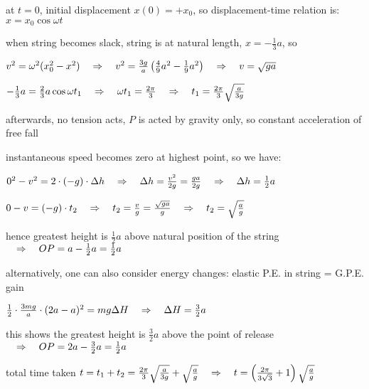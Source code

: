 at $t=0$, initial displacement $x(0)=+x_0$, so displacement-time relation is: $x=x_0\cos\omega t$

when string becomes slack, string is at natural length, $x=-\frac{1}{3}a$, so

{

\centering

$v^2 = \omega^2 (x_0^2 - x^2) \quad \Rightarrow \quad v^2 = \frac{3g}{a} \left( \frac{4}{9}a^2 - \frac{1}{9}a^2 \right) \quad \Rightarrow \quad v=\sqrt{ga}$

$-\frac{1}{3}a = \frac{2}{3}a\cos\omega t_1 \quad \Rightarrow \quad \omega t_1 = \frac{2\pi}{3} \quad \Rightarrow \quad t_1 = \frac{2\pi}{3}\sqrt{\frac{a}{3g}}$

}

afterwards, no tension acts, $P$ is acted by gravity only, so constant acceleration of free fall

instantaneous speed becomes zero at highest point, so we have:

{

\centering

$0^2 - v^2 = 2\cdot(-g) \cdot \Delta h \quad \Rightarrow \quad \Delta h = \frac{v^2}{2g} = \frac{ga}{2g} \quad \Rightarrow \quad \Delta h = \frac{1}{2}a$

$0 - v = (-g)\cdot t_2 \quad \Rightarrow \quad t_2 = \frac{v}{g} = \frac{\sqrt{ga}}{g} \quad \Rightarrow \quad t_2 = \sqrt{\frac{a}{g}}$

}

hence greatest height is $\frac{1}{2}a$ above natural position of the string $\quad \Rightarrow \quad OP=a-\frac{1}{2}a=\frac{1}{2}a$

alternatively, one can also consider energy changes: elastic P.E. in string = G.P.E. gain

{

\centering

$\frac{1}{2}\cdot\frac{3mg}{a}\cdot(2a-a)^2 = mg\Delta H \quad \Rightarrow \quad \Delta H = \frac{3}{2}a$

}

this shows the greatest height is $\frac{3}{2}a$ above the point of release $\quad \Rightarrow \quad OP=2a-\frac{3}{2}a = \frac{1}{2}a$

total time taken $t=t_1+t_2 = \frac{2\pi}{3}\sqrt{\frac{a}{3g}} + \sqrt{\frac{a}{g}} \quad \Rightarrow \quad t = \left(\frac{2\pi}{3\sqrt{3}} + 1\right)\sqrt{\frac{a}{g}}$ \eoe

